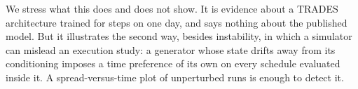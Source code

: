 

We stress what this does and does not show. It is evidence about a TRADES architecture trained for \tradesSteps{} steps on one day, and says nothing about the published model. But it illustrates the second way, besides instability, in which a simulator can mislead an execution study: a generator whose state drifts away from its conditioning imposes a time preference of its own on every schedule evaluated inside it. A spread-versus-time plot of unperturbed runs is enough to detect it.
